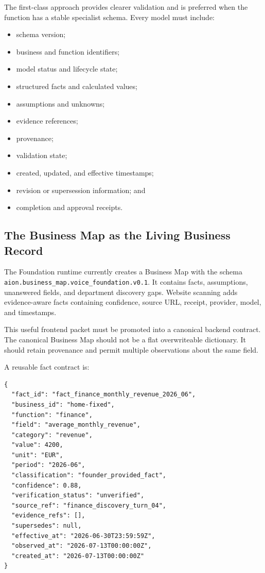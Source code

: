 The first-class approach provides clearer validation and is preferred when the
function has a stable specialist schema. Every model must include:

\begin{itemize}
  \item schema version;
  \item business and function identifiers;
  \item model status and lifecycle state;
  \item structured facts and calculated values;
  \item assumptions and unknowns;
  \item evidence references;
  \item provenance;
  \item validation state;
  \item created, updated, and effective timestamps;
  \item revision or supersession information; and
  \item completion and approval receipts.
\end{itemize}

\subsection{The Business Map as the Living Business Record}

The Foundation runtime currently creates a Business Map with the schema
\texttt{aion.business\_map.voice\_foundation.v0.1}. It contains facts,
assumptions, unanswered fields, and department discovery gaps. Website scanning
adds evidence-aware facts containing confidence, source URL, receipt, provider,
model, and timestamps.

This useful frontend packet must be promoted into a canonical backend contract.
The canonical Business Map should not be a flat overwriteable dictionary. It
should retain provenance and permit multiple observations about the same field.

A reusable fact contract is:

\begin{verbatim}
{
  "fact_id": "fact_finance_monthly_revenue_2026_06",
  "business_id": "home-fixed",
  "function": "finance",
  "field": "average_monthly_revenue",
  "category": "revenue",
  "value": 4200,
  "unit": "EUR",
  "period": "2026-06",
  "classification": "founder_provided_fact",
  "confidence": 0.88,
  "verification_status": "unverified",
  "source_ref": "finance_discovery_turn_04",
  "evidence_refs": [],
  "supersedes": null,
  "effective_at": "2026-06-30T23:59:59Z",
  "observed_at": "2026-07-13T00:00:00Z",
  "created_at": "2026-07-13T00:00:00Z"
}
\end{verbatim}

